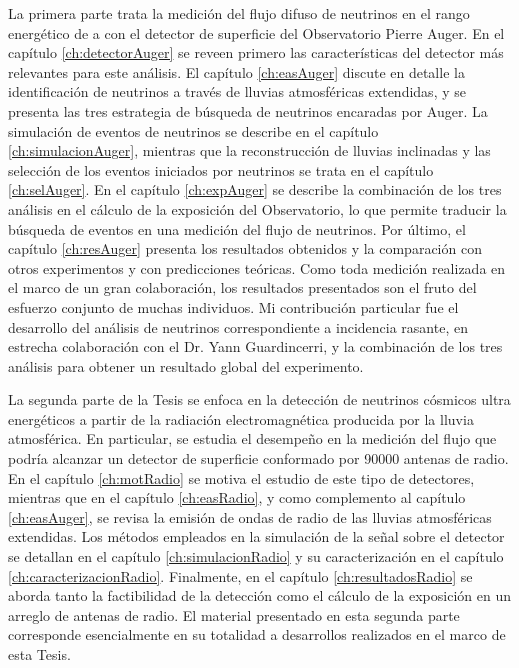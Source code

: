 La primera parte trata la medici\'on del flujo difuso de neutrinos en el rango energ\'etico de  a  con el detector de superficie del Observatorio Pierre Auger. En el cap\'itulo \ref{ch:detectorAuger} se reveen primero las caracter\'isticas del detector m\'as relevantes para este análisis.
El cap\'itulo \ref{ch:easAuger} discute en detalle la identificación de neutrinos a través de lluvias atmosf\'ericas extendidas, y se presenta las tres estrategia de búsqueda de neutrinos encaradas por Auger. La simulación de eventos de neutrinos se describe en el cap\'itulo \ref{ch:simulacionAuger}, mientras que la reconstrucci\'on de lluvias inclinadas y las selecci\'on de los eventos iniciados por neutrinos se trata en el cap\'itulo \ref{ch:selAuger}.
En el cap\'itulo \ref{ch:expAuger} se describe la combinación de los tres análisis en el c\'alculo de la exposici\'on del Observatorio, lo que permite traducir la búsqueda de eventos en una medición del flujo de neutrinos. Por último, el capítulo \ref{ch:resAuger} presenta los resultados obtenidos y la comparación con otros experimentos y con predicciones te\'oricas. Como toda medición realizada en el marco de un gran colaboración, los resultados presentados son el fruto del esfuerzo conjunto de muchas individuos. Mi contribución particular fue el desarrollo del análisis de neutrinos correspondiente a incidencia rasante, en estrecha colaboración con el Dr. Yann Guardincerri, y la combinación de los tres análisis para obtener un resultado global del experimento.

La segunda parte de la Tesis se enfoca en la detecci\'on de neutrinos c\'osmicos ultra energ\'eticos a partir de la radiaci\'on electromagn\'etica producida por la lluvia atmosf\'erica.  En particular, se estudia el desempe\~no en la medici\'on del flujo que podr\'ia alcanzar un detector de superficie conformado por 90000 antenas de radio.
En el cap\'itulo \ref{ch:motRadio} se motiva el estudio de este tipo de detectores, mientras que en el cap\'itulo \ref{ch:easRadio}, y como complemento al cap\'itulo \ref{ch:easAuger}, se revisa la emisi\'on de ondas de radio de las lluvias atmosf\'ericas extendidas.
Los m\'etodos empleados en la simulaci\'on de la se\~nal sobre el detector se detallan en el cap\'itulo \ref{ch:simulacionRadio} y su caracterizaci\'on en el cap\'itulo \ref{ch:caracterizacionRadio}.
Finalmente, en el cap\'itulo \ref{ch:resultadosRadio} se aborda tanto la factibilidad de la detecci\'on como el c\'alculo de la exposici\'on en un arreglo de antenas de radio. El material presentado en esta segunda parte corresponde esencialmente en su totalidad a desarrollos realizados en el marco de esta Tesis.

